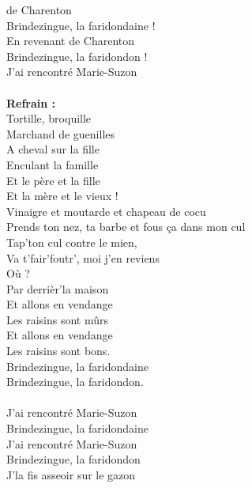 
 de Charenton
\\Brindezingue, la faridondaine !
\\En revenant de Charenton
\\Brindezingue, la faridondon !
\\J'ai rencontré Marie-Suzon
\\\\\textbf{Refrain :}
\\Tortille, broquille
\\Marchand de guenilles
\\A cheval sur la fille
\\Enculant la famille
\\Et le père et la fille
\\Et la mère et le vieux !
\\Vinaigre et moutarde et chapeau de cocu
\\Prends ton nez, ta barbe et fous ça dans mon cul
\\Tap'ton cul contre le mien,
\\Va t'fair'foutr', moi j'en reviens
\\Où ?
\\Par derrièr'la maison
\\Et allons en vendange
\\Les raisins sont mûrs
\\Et allons en vendange
\\Les raisins sont bons.
\\Brindezingue, la faridondaine
\\Brindezingue, la faridondon.
\\\\J'ai rencontré Marie-Suzon
\\Brindezingue, la faridondaine
\\J'ai rencontré Marie-Suzon
\\Brindezingue, la faridondon
\\J'la fis asseoir sur le gazon
\breakpage
